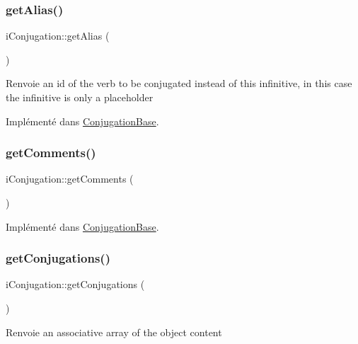 \subsubsection{\texorpdfstring{get\+Alias()}{getAlias()}}
{\footnotesize\ttfamily i\+Conjugation\+::get\+Alias (\begin{DoxyParamCaption}{ }\end{DoxyParamCaption})}

\begin{DoxyReturn}{Renvoie}
an id of the verb to be conjugated instead of this infinitive, in this case the infinitive is only a placeholder 
\end{DoxyReturn}


Implémenté dans \hyperlink{class_conjugation_base_ac8266b933fde0f494a7933c4d2fe0590}{Conjugation\+Base}.

\hypertarget{interfacei_conjugation_ad887ef20e584040fe72f6e5a6212247e}{}\label{interfacei_conjugation_ad887ef20e584040fe72f6e5a6212247e} 
\subsubsection{\texorpdfstring{get\+Comments()}{getComments()}}
{\footnotesize\ttfamily i\+Conjugation\+::get\+Comments (\begin{DoxyParamCaption}{ }\end{DoxyParamCaption})}



Implémenté dans \hyperlink{class_conjugation_base_ac381d5a6d6411aba279cb56e8505bb30}{Conjugation\+Base}.

\hypertarget{interfacei_conjugation_a6c0072d898eb8b2f3756c87dfed4af33}{}\label{interfacei_conjugation_a6c0072d898eb8b2f3756c87dfed4af33} 
\subsubsection{\texorpdfstring{get\+Conjugations()}{getConjugations()}}
{\footnotesize\ttfamily i\+Conjugation\+::get\+Conjugations (\begin{DoxyParamCaption}{ }\end{DoxyParamCaption})}

\begin{DoxyReturn}{Renvoie}
an associative array of the object content 
\end{DoxyReturn}


